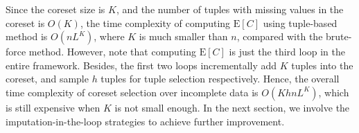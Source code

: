  Since the coreset size is $K$, and  the number of tuples with missing values in the coreset is $O(K)$, the time complexity of computing $\mathrm{E}[C]$ using tuple-based method is $O(nL^K)$, where $K$ is much smaller than $n$, compared with the brute-force method. However, note that computing $\mathrm{E}[C]$ is just the third loop in the entire framework. Besides, the first two loops incrementally add $K$ tuples into the coreset, and sample $h$ tuples for tuple selection respectively. Hence, the overall time complexity of coreset selection over incomplete data is $O(KhnL^K)$, which is still expensive when $K$ is not small enough.  
In the next section, we involve the imputation-in-the-loop strategies to achieve further improvement.







